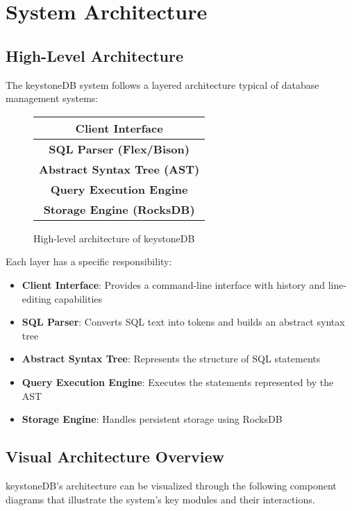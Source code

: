 \documentclass[12pt,a4paper]{article}
\begin{document}
\section{System Architecture}
\subsection{High-Level Architecture}
The keystoneDB system follows a layered architecture typical of database management systems:

\begin{figure}[H]
\centering
\begin{tabular}{|c|}
\hline
\textbf{Client Interface} \\
\hline
\textbf{SQL Parser (Flex/Bison)} \\
\hline
\textbf{Abstract Syntax Tree (AST)} \\
\hline
\textbf{Query Execution Engine} \\
\hline
\textbf{Storage Engine (RocksDB)} \\
\hline
\end{tabular}
\caption{High-level architecture of keystoneDB}
\end{figure}

Each layer has a specific responsibility:
\begin{itemize}
    \item \textbf{Client Interface}: Provides a command-line interface with history and line-editing capabilities
    \item \textbf{SQL Parser}: Converts SQL text into tokens and builds an abstract syntax tree
    \item \textbf{Abstract Syntax Tree}: Represents the structure of SQL statements
    \item \textbf{Query Execution Engine}: Executes the statements represented by the AST
    \item \textbf{Storage Engine}: Handles persistent storage using RocksDB
\end{itemize}

\subsection{Visual Architecture Overview}
keystoneDB's architecture can be visualized through the following component diagrams that illustrate the system's key modules and their interactions.

\clearpage %
\end{document}
